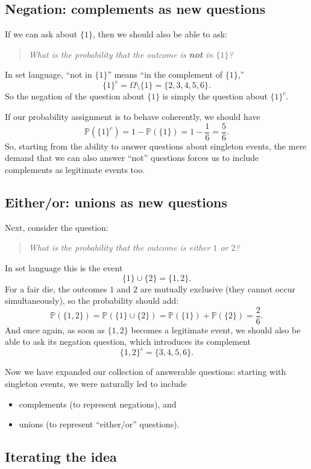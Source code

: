 \documentclass[11pt]{article}
\theoremstyle{remark}
\begin{document}
\subsection{Negation: complements as new questions}

If we can ask about \(\{1\}\), then we should also be able to ask:
\begin{quote}
\emph{What is the probability that the outcome is \textbf{not} in \(\{1\}\)?}
\end{quote}
In set language, “not in \(\{1\}\)” means “in the complement of \(\{1\}\),”
\[
\{1\}^c = \Omega \setminus \{1\} = \{2,3,4,5,6\}.
\]
So the negation of the question about \(\{1\}\) is simply the question about \(\{1\}^c\).

If our probability assignment is to behave coherently, we should have
\[
\mathbb{P}(\{1\}^c) = 1 - \mathbb{P}(\{1\}) = 1-\frac{1}{6} = \frac{5}{6}.
\]
So, starting from the ability to answer questions about singleton events,
the mere demand that we can also answer “not” questions forces us to include
complements as legitimate events too.

\subsection{Either/or: unions as new questions}

Next, consider the question:
\begin{quote}
\emph{What is the probability that the outcome is either \(1\) or \(2\)?}
\end{quote}
In set language this is the event
\[
\{1\}\cup \{2\} = \{1,2\}.
\]
For a fair die, the outcomes \(1\) and \(2\) are mutually exclusive (they cannot occur
simultaneously), so the probability should add:
\[
\mathbb{P}(\{1,2\}) = \mathbb{P}(\{1\}\cup \{2\})
= \mathbb{P}(\{1\})+\mathbb{P}(\{2\}) = \frac{2}{6}.
\]
And once again, as soon as \(\{1,2\}\) becomes a legitimate event, we should also be able
to ask its negation question, which introduces its complement
\[
\{1,2\}^c = \{3,4,5,6\}.
\]

Now we have expanded our collection of answerable questions:
starting with singleton events, we were naturally led to include
\begin{itemize}
\item complements (to represent negations), and
\item unions (to represent “either/or” questions).
\end{itemize}

\subsection{Iterating the idea}
\end{document}
